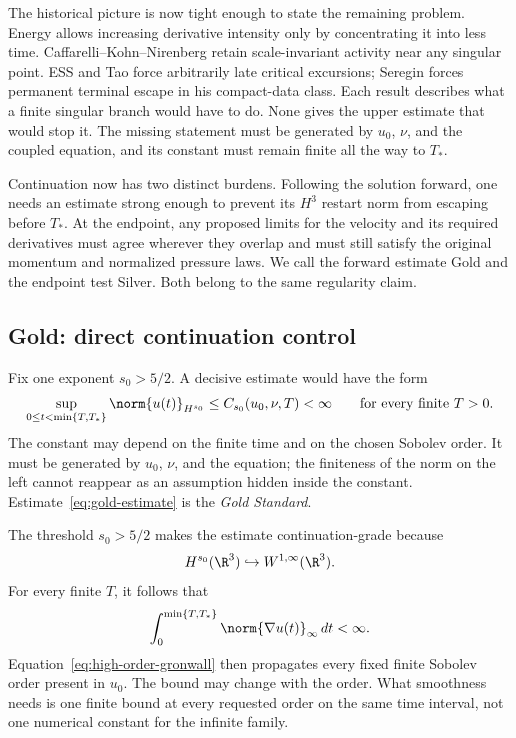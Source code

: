 The historical picture is now tight enough to state the remaining problem.
Energy allows increasing derivative intensity only by concentrating it into
less time.  Caffarelli--Kohn--Nirenberg retain scale-invariant activity near
any singular point.  ESS and Tao force arbitrarily late critical excursions;
Seregin forces permanent terminal escape in his compact-data class.  Each
result describes what a finite singular branch would have to do.  None gives
the upper estimate that would stop it.  The missing statement must be generated
by \(u_0\), \(\nu\), and the coupled equation, and its constant must remain
finite all the way to \(T_*\).

Continuation now has two distinct burdens.  Following the solution forward,
one needs an estimate strong enough to prevent its \(H^3\) restart norm from
escaping before \(T_*\).  At the endpoint, any proposed limits for the velocity
and its required derivatives must agree wherever they overlap and must still
satisfy the original momentum and normalized pressure laws.  We call the
forward estimate Gold and the endpoint test Silver.  Both belong to the same
regularity claim.

\subsection{Gold: direct continuation control}
\label{sec:gold-standard}

Fix one exponent \(s_0>5/2\).  A decisive estimate would have the form
\begin{equation}
 \sup_{0\le t<\min\{T,T_*\}}\norm{u(t)}_{H^{s_0}}
 \le C_{s_0}(u_0,\nu,T)<\infty
 \qquad\text{for every finite }T>0.
 \label{eq:gold-estimate}
\end{equation}
The constant may depend on the finite time and on the chosen Sobolev order.
It must be generated by \(u_0\), \(\nu\), and the equation; the finiteness of
the norm on the left cannot reappear as an assumption hidden inside the
constant.  Estimate~\eqref{eq:gold-estimate} is the \emph{Gold Standard}.

The threshold \(s_0>5/2\) makes the estimate continuation-grade because
\begin{equation*}
 H^{s_0}(\R^3)\hookrightarrow W^{1,\infty}(\R^3).
\end{equation*}
For every finite \(T\), it follows that
\begin{equation*}
 \int_0^{\min\{T,T_*\}}\norm{\nabla u(t)}_\infty\,dt<\infty.
\end{equation*}
Equation~\eqref{eq:high-order-gronwall} then propagates every fixed finite
Sobolev order present in \(u_0\).  The bound may change with the order.  What
smoothness needs is one finite bound at every requested order on the same time
interval, not one numerical constant for the infinite family.

